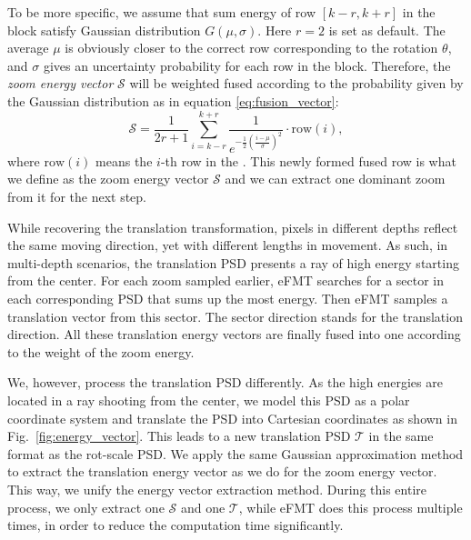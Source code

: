 \documentclass[letterpaper, 10 pt, conference]{ieeeconf}  %
\begin{document}
To be more specific, we assume that sum energy of row $[k-r, k+r]$ in the block satisfy Gaussian distribution $G(\mu, \sigma)$. Here $r=2$ is set as default. The average $\mu$ is obviously closer to the correct row corresponding to the rotation $\theta$, and $\sigma$ gives an uncertainty probability for each row in the block. Therefore, the \textit{zoom energy vector} $\mathcal{S}$ will be weighted fused according to the probability given by the Gaussian distribution as in equation \ref{eq:fusion_vector}:
\begin{equation}
    \mathcal{S} = \frac{1}{2r + 1}\sum\limits_{i=k-r}^{k+r}{\frac{1}{e^{-\frac{1}{2}{(\frac{i - \mu}{\sigma})}^2 }}}\cdot \text{row}(i) ,
    \label{eq:fusion_vector}
\end{equation}
where $\text{row}(i)$ means the $i$-th row in the . This newly formed fused row is what we define as the zoom energy vector $\mathcal{S}$ and we can extract one dominant zoom from it for the next step.

While recovering the translation transformation, pixels in different depths reflect the same moving direction, yet with different lengths in movement. As such, in multi-depth scenarios, the translation PSD presents a ray of high energy starting from the center. For each zoom sampled earlier, eFMT searches for a sector in each corresponding PSD that sums up the most energy. Then eFMT samples a translation vector from this sector. The sector direction stands for the translation direction. All these translation energy vectors are finally fused into one according to the weight of the zoom energy.


We, however, process the translation PSD differently. As the high energies are located in a ray shooting from the center, we model this PSD as a polar coordinate system and translate the PSD into Cartesian coordinates as shown in Fig.~\ref{fig:energy_vector}. This leads to a new translation PSD $\mathcal{T}$ in the same format as the rot-scale PSD. We apply the same Gaussian approximation method to extract the translation energy vector as we do for the zoom energy vector. This way, we unify the energy vector extraction method. During this entire process, we only extract one $\mathcal{S}$ and one $\mathcal{T}$, while eFMT does this process multiple times, in order to reduce the computation time significantly.
\end{document}
